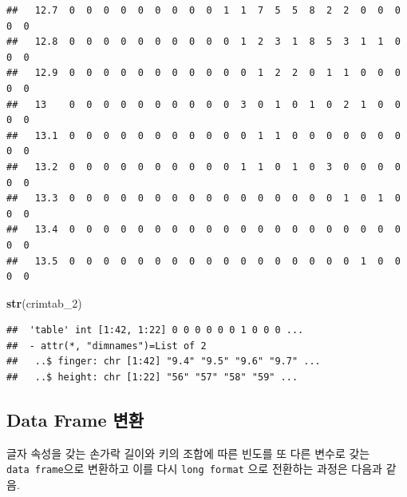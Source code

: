 \documentclass[
]{article}
\newenvironment{Shaded}{\begin{snugshade}}{\end{snugshade}}
\newcommand{\DecValTok}[1]{\textcolor[rgb]{0.00,0.00,0.81}{#1}}
\newcommand{\KeywordTok}[1]{\textcolor[rgb]{0.13,0.29,0.53}{\textbf{#1}}}
\newcommand{\NormalTok}[1]{#1}
\begin{document}
\begin{verbatim}
##   12.7  0  0  0  0  0  0  0  0  0  1  1  7  5  5  8  2  2  0  0  0  0  0
##   12.8  0  0  0  0  0  0  0  0  0  0  1  2  3  1  8  5  3  1  1  0  0  0
##   12.9  0  0  0  0  0  0  0  0  0  0  0  1  2  2  0  1  1  0  0  0  0  0
##   13    0  0  0  0  0  0  0  0  0  0  3  0  1  0  1  0  2  1  0  0  0  0
##   13.1  0  0  0  0  0  0  0  0  0  0  0  1  1  0  0  0  0  0  0  0  0  0
##   13.2  0  0  0  0  0  0  0  0  0  0  1  1  0  1  0  3  0  0  0  0  0  0
##   13.3  0  0  0  0  0  0  0  0  0  0  0  0  0  0  0  0  1  0  1  0  0  0
##   13.4  0  0  0  0  0  0  0  0  0  0  0  0  0  0  0  0  0  0  0  0  0  0
##   13.5  0  0  0  0  0  0  0  0  0  0  0  0  0  0  0  0  0  1  0  0  0  0
\end{verbatim}

\begin{Shaded}
\begin{Highlighting}[]
\KeywordTok{str}\NormalTok{(crimtab_}\DecValTok{2}\NormalTok{)}
\end{Highlighting}
\end{Shaded}

\begin{verbatim}
##  'table' int [1:42, 1:22] 0 0 0 0 0 0 1 0 0 0 ...
##  - attr(*, "dimnames")=List of 2
##   ..$ finger: chr [1:42] "9.4" "9.5" "9.6" "9.7" ...
##   ..$ height: chr [1:22] "56" "57" "58" "59" ...
\end{verbatim}

\hypertarget{data-frame-uxbcc0uxd658}{%
\subsection{Data Frame 변환}\label{data-frame-uxbcc0uxd658}}

글자 속성을 갖는 손가락 길이와 키의 조합에 따른 빈도를 또 다른 변수로
갖는 \texttt{data\ frame}으로 변환하고 이를 다시 \texttt{long\ format}
으로 전환하는 과정은 다음과 같음.
\end{document}
